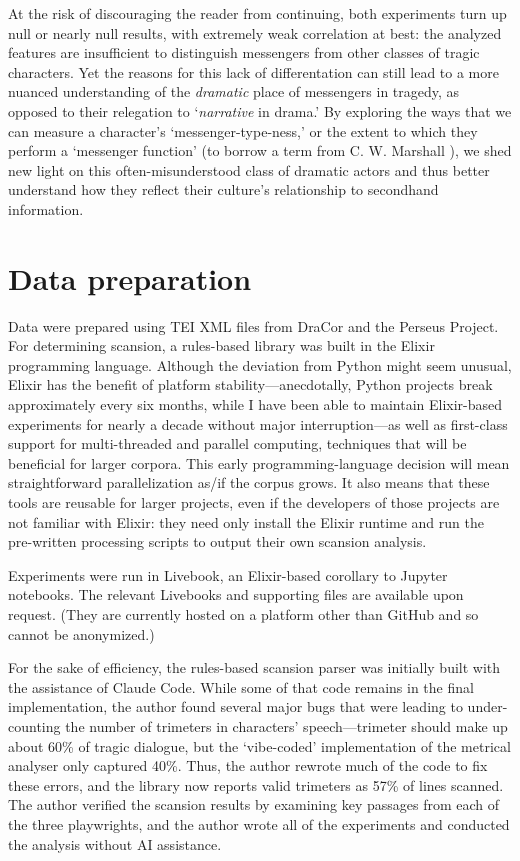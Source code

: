 \documentclass[
]{ceurart}
\begin{document}
At the risk of discouraging the reader from continuing, both experiments turn
up null or nearly null results, with extremely weak correlation at best: the
analyzed features are insufficient to distinguish messengers from other
classes of tragic characters. Yet the reasons for this lack of differentation
can still lead to a more nuanced understanding of the \textit{dramatic} place
of messengers in tragedy, as opposed to their relegation to `\textit
{narrative} in drama.' By exploring the ways that we can measure a
character's `messenger-type-ness,' or the extent to which they perform a
`messenger function' (to borrow a term from C. W. Marshall \cite
{Marshall2006}), we shed new light on this often-misunderstood class of
dramatic actors and thus better understand how they reflect their culture's
relationship to secondhand information.

\section{Data preparation}

Data were prepared using TEI XML files from DraCor and the Perseus Project.
For determining scansion, a rules-based library was built in the Elixir
programming language. Although the deviation from Python might seem unusual,
Elixir has the benefit of platform stability---anecdotally, Python projects
break approximately every six months, while I have been able to maintain
Elixir-based experiments for nearly a decade without major interruption---as
well as first-class support for multi-threaded and parallel computing,
techniques that will be beneficial for larger corpora. This early
programming-language decision will mean straightforward parallelization as/if
the corpus grows. It also means that these tools are reusable for larger
projects, even if the developers of those projects are not familiar with
Elixir: they need only install the Elixir runtime and run the pre-written
processing scripts to output their own scansion analysis.

Experiments were run in Livebook, an Elixir-based corollary to Jupyter
notebooks. The relevant Livebooks and supporting files are available upon
request. (They are currently hosted on a platform other than GitHub and so
cannot be anonymized.)

For the sake of efficiency, the rules-based scansion parser was initially
built with the assistance of Claude Code. While some of that code remains in
the final implementation, the author found several major bugs that were
leading to under-counting the number of trimeters in characters'
speech---trimeter should make up about 60\% of tragic dialogue, but the
`vibe-coded' implementation of the metrical analyser only captured 40\%.
Thus, the author rewrote much of the code to fix these errors, and the
library now reports valid trimeters as 57\% of lines scanned. The author
verified the scansion results by examining key passages from each of the
three playwrights, and the author wrote all of the experiments and conducted
the analysis without AI assistance.
\end{document}
